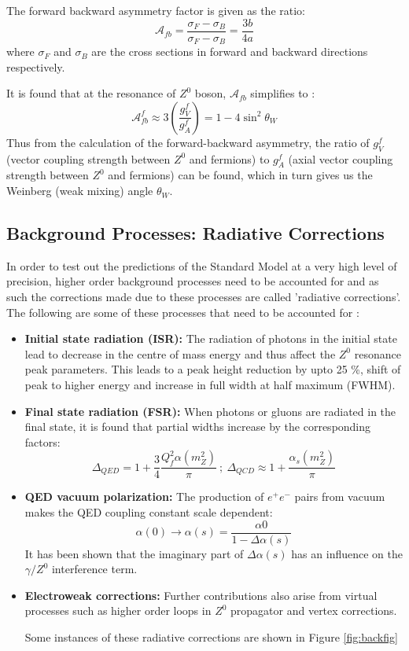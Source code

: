 The forward backward asymmetry factor is given as the ratio:
\begin{equation}
\mathcal{A}_{fb}=\dfrac{\sigma_{F}-\sigma_{B}}{\sigma_{F}-\sigma_{B}}=\dfrac{3b}{4a}
\end{equation}
where $\sigma_{F}$ and $\sigma_{B}$ are the cross sections in forward and backward directions respectively.

It is found that at the resonance of $Z^{0}$ boson, $\mathcal{A}_{fb}$ simplifies to \cite{UB}:
\begin{equation}
\label{eqn:Weinbergangle}
\mathcal{A}_{fb}^{f}\approx 3\left(\dfrac{g_{V}^{f}}{g_{A}^{f}}\right)=1-4\sin^{2}\theta_{W} 
\end{equation}
Thus from the calculation of the forward-backward asymmetry, the ratio of $g_{V}^{f}$ (vector coupling strength between $Z^{0}$ and fermions) to $g_{A}^{f}$ (axial vector coupling strength between $Z^{0}$ and fermions) can be found, which in turn gives us the Weinberg (weak mixing) angle $\theta_{W}$.
\subsection{Background Processes: Radiative Corrections}
In order to test out the predictions of the Standard Model at a very high level of precision, higher order background processes need to be accounted for and as such the corrections made due to these processes are called 'radiative corrections'. The following are some of these processes that need to be accounted for \cite{Zedometry}:
\begin{itemize}
\item \textbf{Initial state radiation (ISR):} The radiation of photons in the initial state lead to decrease in the centre of mass energy and thus affect the $Z^{0}$ resonance peak parameters. This leads to a peak height reduction by upto 25 \%, shift of peak to higher energy and increase in full width at half maximum (FWHM). 
\item \textbf{Final state radiation (FSR):} When photons or gluons are radiated in the final state, it is found that partial widths increase by the corresponding factors:
\begin{equation}
\Delta_{QED}=1+\dfrac{3}{4}\dfrac{Q_{f}^{2}\alpha(m_{Z}^{2})}{\pi}\ ;\ \Delta_{QCD}\approx 1+\dfrac{\alpha_{s}(m_{Z}^{2})}{\pi}
\end{equation}
\item \textbf{QED vacuum polarization:} The production of $e^{+}e^{-}$ pairs from vacuum makes the QED coupling constant scale dependent: 
\begin{equation}
\alpha(0)\rightarrow \alpha(s)=\dfrac{\alpha{0}}{1-\Delta \alpha(s)}
\end{equation}
It has been shown that the imaginary part of $\Delta \alpha(s)$ has an influence on the $\gamma / Z^{0}$ interference term.
\item \textbf{Electroweak corrections:} Further contributions also arise from virtual processes such as higher order loops in $Z^{0}$ propagator and vertex corrections.


Some instances of these radiative corrections are shown in Figure \ref{fig:backfig}
\end{itemize}


